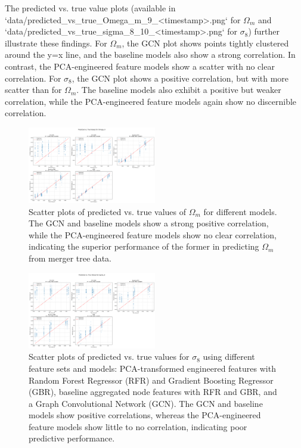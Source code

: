 \documentclass[twocolumn]{aastex631}
\begin{document}
The predicted vs. true value plots (available in `data/predicted\_vs\_true\_Omega\_m\_9_<timestamp>.png` for $\Omega_m$ and `data/predicted\_vs\_true\_sigma\_8\_10_<timestamp>.png` for $\sigma_8$) further illustrate these findings. For $\Omega_m$, the GCN plot shows points tightly clustered around the y=x line, and the baseline models also show a strong correlation. In contrast, the PCA-engineered feature models show a scatter with no clear correlation. For $\sigma_8$, the GCN plot shows a positive correlation, but with more scatter than for $\Omega_m$. The baseline models also exhibit a positive but weaker correlation, while the PCA-engineered feature models again show no discernible correlation.

\begin{figure}[h!]
    \centering
    \includegraphics[width=0.5\textwidth]{../input_files/plots/predicted_vs_true_Omega_m_9_20250527-135752.png}
    \caption{Scatter plots of predicted vs. true values of $\Omega_m$ for different models. The GCN and baseline models show a strong positive correlation, while the PCA-engineered feature models show no clear correlation, indicating the superior performance of the former in predicting $\Omega_m$ from merger tree data.}
    \label{fig:predicted_vs_true_omega_m}
\end{figure}

\begin{figure}[h!]
    \centering
    \includegraphics[width=0.5\textwidth]{../input_files/plots/predicted_vs_true_sigma_8_10_20250527-135752.png}
    \caption{Scatter plots of predicted vs. true values for $\sigma_8$ using different feature sets and models: PCA-transformed engineered features with Random Forest Regressor (RFR) and Gradient Boosting Regressor (GBR), baseline aggregated node features with RFR and GBR, and a Graph Convolutional Network (GCN). The GCN and baseline models show positive correlations, whereas the PCA-engineered feature models show little to no correlation, indicating poor predictive performance.}
    \label{fig:predicted_vs_true_sigma_8}
\end{figure}
\end{document}
